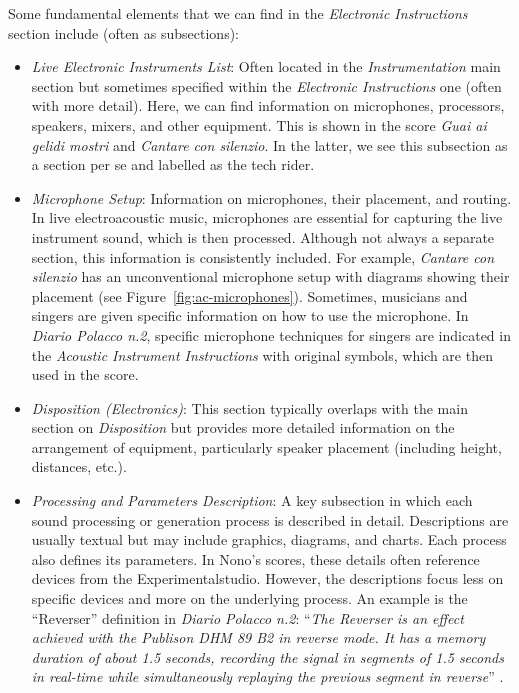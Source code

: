 Some fundamental elements that we can find in the \textit{Electronic Instructions} section include (often as subsections):
\begin{itemize}
    \item \textit{Live Electronic Instruments List}: Often located in the \textit{Instrumentation} main section but sometimes specified within the \textit{Electronic Instructions} one (often with more detail). Here, we can find information on microphones, processors, speakers, mixers, and other equipment. This is shown in the score \textit{Guai ai gelidi mostri} and \textit{Cantare con silenzio}. In the latter, we see this subsection as a section per se and labelled as the tech rider.
    \item \textit{Microphone Setup}: Information on microphones, their placement, and routing. In live electroacoustic music, microphones are essential for capturing the live instrument sound, which is then processed. Although not always a separate section, this information is consistently included. For example, \textit{Cantare con silenzio} has an unconventional microphone setup with diagrams showing their placement (see Figure~\ref{fig:ac-microphones}). Sometimes, musicians and singers are given specific information on how to use the microphone. In \textit{Diario Polacco n.2}, specific microphone techniques for singers are indicated in the \textit{Acoustic Instrument Instructions} with original symbols, which are then used in the score.
    \item \textit{Disposition (Electronics)}: This section typically overlaps with the main section on \textit{Disposition} but provides more detailed information on the arrangement of equipment, particularly speaker placement (including height, distances, etc.).
    \item \textit{Processing and Parameters Description}: A key subsection in which each sound processing or generation process is described in detail. Descriptions are usually textual but may include graphics, diagrams, and charts. Each process also defines its parameters. In Nono’s scores, these details often reference devices from the Experimentalstudio. However, the descriptions focus less on specific devices and more on the underlying process. An example is the ``Reverser'' definition in \textit{Diario Polacco n.2}: ``\textit{The Reverser is an effect achieved with the Publison DHM 89 B2 in reverse mode. It has a memory duration of about 1.5 seconds, recording the signal in segments of 1.5 seconds in real-time while simultaneously replaying the previous segment in reverse}” \cite{nono1982quando}.

\end{itemize}
